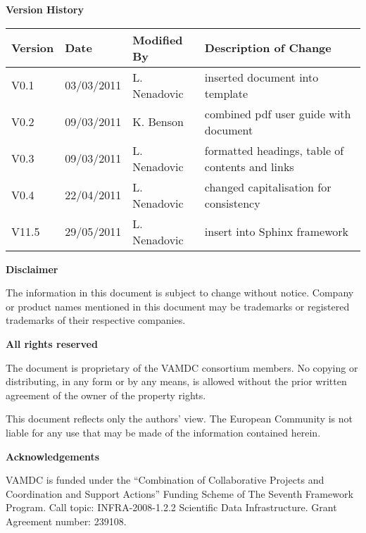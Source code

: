 {\begin{titlepage}
\end{titlepage}

\noindent \textbf{Version History}

\textbf{}

\noindent \begin{tabular}{|l|l|l|l|} 
\hline 
\textbf{Version} & \textbf{Date} & \textbf{Modified By} & \textbf{Description of Change} \\ \hline 
V0.1  & 03/03/2011 & L. Nenadovic  & inserted document into template \\ \hline 
V0.2  & 09/03/2011 & K. Benson & combined pdf user guide with document \\ \hline 
V0.3  & 09/03/2011 & L. Nenadovic & formatted headings, table of contents and links \\ \hline 
V0.4  & 22/04/2011 & L. Nenadovic & changed capitalisation for consistency \\ \hline 
V11.5 & 29/05/2011 & L. Nenadovic  & insert into Sphinx framework \\ \hline 
\end{tabular}

\textbf{}

\noindent \textbf{Disclaimer}

\noindent The information in this document is subject to change without notice. Company or product names mentioned in this document may be trademarks or registered trademarks of their respective companies.


\textbf{}

\noindent \textbf{All rights reserved}

\noindent The document is proprietary of the VAMDC consortium members. No copying or distributing, in any form or by any means, is allowed without the prior written agreement of the owner of the property rights.

\noindent 

\noindent This document reflects only the authors' view. The European Community is not liable for any use that may be made of the information contained herein.

\textbf{}

\noindent \textbf{Acknowledgements}

\noindent VAMDC is funded under the ``Combination of Collaborative Projects and Coordination and  Support Actions'' Funding Scheme of The Seventh Framework Program. Call topic: INFRA-2008-1.2.2 Scientific Data Infrastructure. Grant Agreement number: 239108.

\textbf{}

}